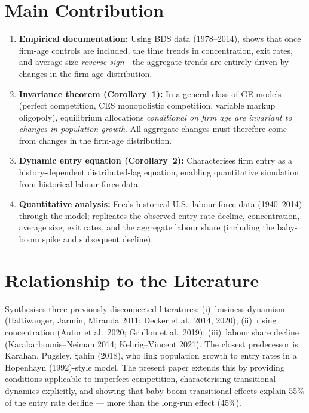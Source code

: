 \section{Main Contribution}

\begin{enumerate}
  \item \textbf{Empirical documentation:} Using BDS data (1978--2014),
    shows that once firm-age controls are included, the time trends in
    concentration, exit rates, and average size \emph{reverse sign}---the
    aggregate trends are entirely driven by changes in the firm-age
    distribution.

  \item \textbf{Invariance theorem (Corollary~1):} In a general class of
    GE models (perfect competition, CES monopolistic competition, variable
    markup oligopoly), equilibrium allocations \emph{conditional on firm
    age are invariant to changes in population growth}. All aggregate
    changes must therefore come from changes in the firm-age distribution.

  \item \textbf{Dynamic entry equation (Corollary~2):} Characterises
    firm entry as a history-dependent distributed-lag equation, enabling
    quantitative simulation from historical labour force data.

  \item \textbf{Quantitative analysis:} Feeds historical U.S.\ labour
    force data (1940--2014) through the model; replicates the observed
    entry rate decline, concentration, average size, exit rates, and the
    aggregate labour share (including the baby-boom spike and subsequent
    decline).
\end{enumerate}

\section{Relationship to the Literature}

Synthesises three previously disconnected literatures: (i)~business
dynamism (Haltiwanger, Jarmin, Miranda 2011; Decker et al.\ 2014, 2020);
(ii)~rising concentration (Autor et al.\ 2020; Grullon et al.\ 2019);
(iii)~labour share decline (Karabarbounis--Neiman 2014; Kehrig--Vincent
2021). The closest predecessor is Karahan, Pugsley, \c{S}ahin (2018), who
link population growth to entry rates in a Hopenhayn (1992)-style model.
The present paper extends this by providing conditions applicable to imperfect
competition, characterising transitional dynamics explicitly, and showing
that baby-boom transitional effects explain 55\% of the entry rate decline
--- more than the long-run effect (45\%).

